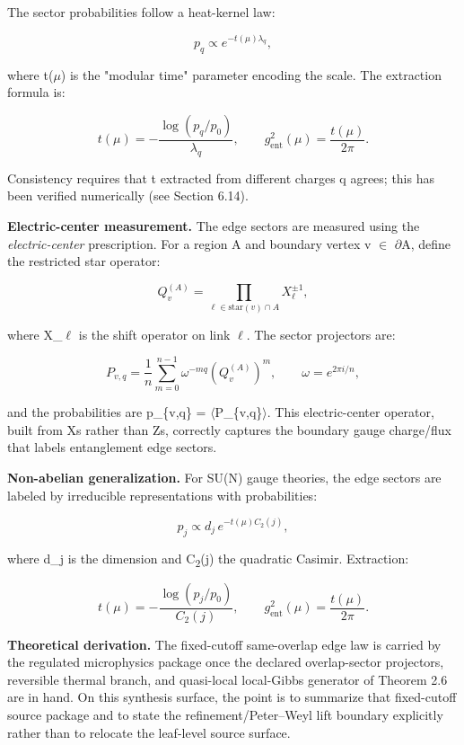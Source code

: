 The sector probabilities follow a heat-kernel law:

\[
p_q \propto e^{-t(\mu) \lambda_q},
\]

where t(\ensuremath{\mu}) is the "modular time" parameter encoding the scale. The extraction formula is:

\[
t(\mu) = -\frac{\log(p_q/p_0)}{\lambda_q}, \qquad
g_{\mathrm{ent}}^2(\mu) = \frac{t(\mu)}{2\pi}.
\]

Consistency requires that t extracted from different charges q agrees; this has been verified numerically (see Section 6.14).

\textbf{Electric-center measurement.} The edge sectors are measured using the \emph{electric-center} prescription. For a region A and boundary vertex v \ensuremath{\in} \ensuremath{\partial}A, define the restricted star operator:

\[
Q_v^{(A)} = \prod_{\ell \in \mathrm{star}(v) \cap A} X_\ell^{\pm 1},
\]

where X\_\ensuremath{\ell} is the shift operator on link \ensuremath{\ell}. The sector projectors are:

\[
P_{v,q} = \frac{1}{n} \sum_{m=0}^{n-1} \omega^{-mq} \left(Q_v^{(A)}\right)^m,
\qquad \omega = e^{2\pi i/n},
\]

and the probabilities are p\_\{v,q\} = \ensuremath{\langle}P\_\{v,q\}\ensuremath{\rangle}. This electric-center operator, built from X\textquotesingle s rather than Z\textquotesingle s, correctly captures the boundary gauge charge/flux that labels entanglement edge sectors.

\textbf{Non-abelian generalization.} For SU(N) gauge theories, the edge sectors are labeled by irreducible representations with probabilities:

\[
p_j \propto d_j \, e^{-t(\mu) C_2(j)},
\]

where d\_j is the dimension and C\textsubscript{2}(j) the quadratic Casimir. Extraction:

\[
t(\mu) = -\frac{\log(p_j/p_0)}{C_2(j)}, \qquad
g_{\mathrm{ent}}^2(\mu) = \frac{t(\mu)}{2\pi}.
\]

\textbf{Theoretical derivation.} The fixed-cutoff same-overlap edge law is carried by the
regulated microphysics package once the declared overlap-sector projectors, reversible thermal
branch, and quasi-local local-Gibbs generator of Theorem 2.6 are in hand. On this synthesis
surface, the point is to summarize that fixed-cutoff source package and to state the
refinement/Peter--Weyl lift boundary explicitly rather than to relocate the leaf-level source
surface.

